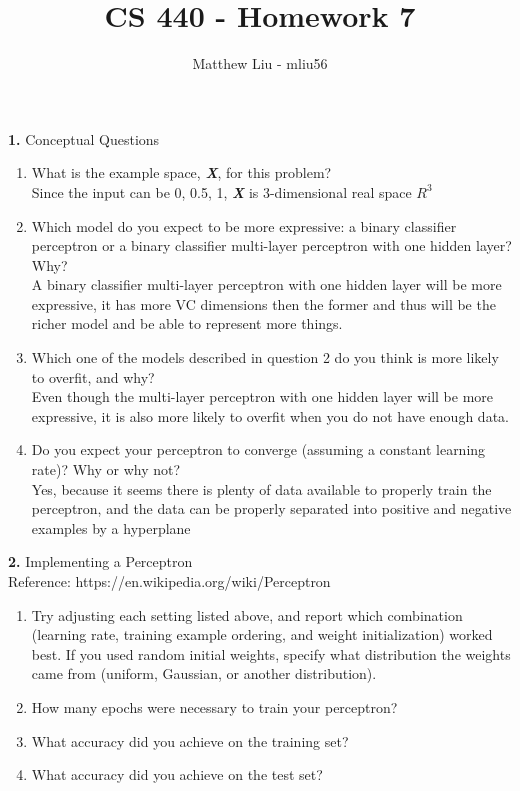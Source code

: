 \documentclass[titlepage]{article}
\title{CS 440 - Homework 7}
\author{Matthew Liu - mliu56}
\date{}
\begin{document}
\maketitle{}

\noindent \textbf{1. } Conceptual Questions \\

\begin{enumerate}
	\item What is the example space, \textbf{\textit{X}}, for this problem? \\
	Since the input can be {0, 0.5, 1}, \textbf{\textit{X}} is 3-dimensional real space $R^3$
	\item Which model do you expect to be more expressive: a binary classifier perceptron or a binary classifier multi-layer perceptron with one hidden layer? Why? \\
	A binary classifier multi-layer perceptron with one hidden layer will be more expressive, it has more VC dimensions then the former and thus will be the richer model and be able to represent more things.
	\item Which one of the models described in question 2 do you think is more likely to overfit, and why? \\
	Even though the multi-layer perceptron with one hidden layer will be more expressive, it is also more likely to overfit when you do not have enough data.
	\item Do you expect your perceptron to converge (assuming a constant learning rate)? Why or why not? \\
	Yes, because it seems there is plenty of data available to properly train the perceptron, and the data can be properly separated into positive and negative examples by a hyperplane
\end{enumerate}

\pagebreak

\noindent \textbf{2. } Implementing a Perceptron \\

Reference: https://en.wikipedia.org/wiki/Perceptron

\begin{enumerate}
	\item Try adjusting each setting listed above, and report which combination (learning rate, training example ordering, and weight initialization) worked best. If you used random initial weights, specify what distribution the weights came from (uniform, Gaussian, or another distribution).
	\item How many epochs were necessary to train your perceptron?
	\item What accuracy did you achieve on the training set?
	\item What accuracy did you achieve on the test set?	
\end{enumerate}
\end{document}
